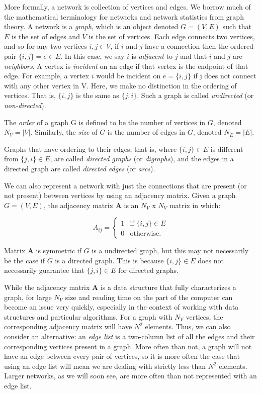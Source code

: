\documentclass[12pt,twoside]{amherstthesis}
\begin{document}
  More formally, a network is collection of vertices and edges. We borrow
  much of the mathematical terminology for networks and network statistics
  from graph theory. A network is a \emph{graph}, which is an object
  denoted \(G = (V, E)\) such that \(E\) is the set of edges and \(V\) is
  the set of vertices. Each edge connects two vertices, and so for any two
  vertices \(i, j \in V\), if \(i\) and \(j\) have a connection then the
  ordered pair \(\{i, j\} = e \in E\). In this case, we say \(i\) is
  \emph{adjacent} to \(j\) and that \(i\) and \(j\) are \emph{neighbors}.
  A vertex is \emph{incident} on an edge if that vertex is the endpoint of
  that edge. For example, a vertex \(i\) would be incident on
  \(e = \{i, j\}\) if j does not connect with any other vertex in V. Here,
  we make no distinction in the ordering of vertices. That is,
  \(\{i, j\}\) is the same as \(\{j, i\}\). Such a graph is called
  \emph{undirected} (or \emph{non-directed}).
  
  The \emph{order} of a graph G is defined to be the number of vertices in
  \(G\), denoted \(N_V = |V|\). Similarly, the \emph{size} of \(G\) is the
  number of edges in \(G\), denoted \(N_E = |E|\).
  
  Graphs that have ordering to their edges, that is, where
  \(\{i, j\} \in E\) is different from \(\{j, i\} \in E\), are called
  \emph{directed graphs} (or \emph{digraphs}), and the edges in a directed
  graph are called \emph{directed edges} (or \emph{arcs}).
  
  We can also represent a network with just the connections that are
  present (or not present) between vertices by using an adjacency matrix.
  Given a graph \(G = (V, E)\), the adjacency matrix \(\textbf{A}\) is an
  \(N_V\) x \(N_V\) matrix in which:
  
  \[ A_{ij} = \begin{cases}
      1 & \text{if } \{i, j\} \in E \\
      0 & \text{otherwise.} 
    \end{cases}
  \]
  
  Matrix \(\textbf{A}\) is symmetric if \(G\) is a undirected graph, but
  this may not necessarily be the case if \(G\) is a directed graph. This
  is because \(\{i, j\} \in E\) does not necessarily guarantee that
  \(\{j, i\} \in E\) for directed graphs.
  
  While the adjacency matrix \(\textbf{A}\) is a data structure that fully
  characterizes a graph, for large \(N_{V}\) size and reading time on the
  part of the computer can become an issue very quickly, especially in the
  context of working with data structures and particular algorithms. For a
  graph with \(N_{V}\) vertices, the corresponding adjacency matrix will
  have \(N^2\) elements. Thus, we can also consider an alternative: an
  \emph{edge list} is a two-column list of all the edges and their
  corresponding vertices present in a graph. More often than not, a graph
  will not have an edge between every pair of vertices, so it is more
  often the case that using an edge list will mean we are dealing with
  strictly less than \(N^2\) elements. Larger networks, as we will soon
  see, are more often than not represented with an edge list.
  
\end{document}
